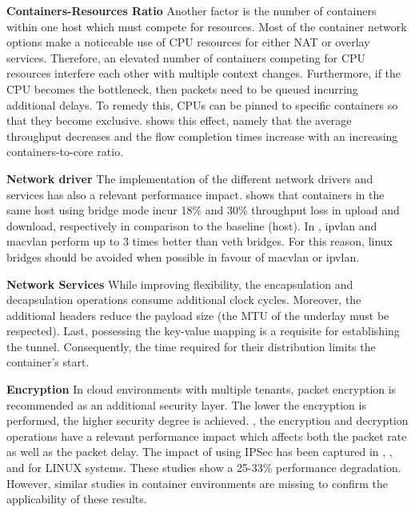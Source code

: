 \documentclass[conference]{IEEEtran}
\begin{document}
\noindent\textbf{Containers-Resources Ratio}\hspace{0.2cm}
Another factor is the number of containers within one host which must compete for resources. Most of the container network options make a noticeable use of CPU resources for either NAT or overlay services. Therefore, an elevated number of containers competing for CPU resources interfere each other with multiple context changes. Furthermore, if the CPU becomes the bottleneck, then packets need to be queued incurring additional delays. To remedy this, CPUs can be pinned to specific containers so that they become exclusive. \cite{Boeira:2021} shows this effect, namely that the average throughput decreases and the flow completion times increase with an increasing containers-to-core ratio. 

\noindent\textbf{Network driver}\hspace{0.2cm}
The implementation of the different network drivers and services has also a relevant performance impact. \cite{IEEE_INFOCOM_2018:K. Suo} shows that containers in the same host using bridge mode incur 18\% and 30\% throughput loss in upload and download, respectively in comparison to the baseline (host). In \cite{NOMS_2016:Claasen}, ipvlan and macvlan perform up to 3 times better than veth bridges. For this reason, linux bridges should be avoided when possible in favour of macvlan or ipvlan.

\noindent\textbf{Network Services}\hspace{0.2cm}
While improving flexibility, the encapsulation and decapsulation operations consume additional clock cycles. Moreover, the additional headers reduce the payload size (the MTU of the underlay must be respected). Last, possessing the key-value mapping is a requisite for establishing the tunnel. Consequently, the time required for their distribution limits the container's start.

\noindent\textbf{Encryption}\hspace{0.2cm}
In cloud environments with multiple tenants, packet encryption is recommended as an additional security layer. The lower the encryption is performed, the higher security degree is achieved. 	, the encryption and decryption operations have a relevant performance impact which affects both the packet rate as well as the packet delay. The impact of using IPSec has been captured in \cite{IPsec:2002:Miltchev}, \cite{Ferrante:2005}, and \cite{ICCET:2010} for LINUX systems. These studies show a 25-33\% performance degradation. However, similar studies in container environments are missing to confirm the applicability of these results. 
\end{document}
